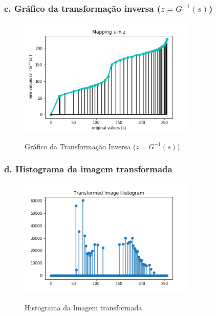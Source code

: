 \documentclass{article}
\begin{document}
\subsubsection*{c. Gráfico da transformação inversa ($z = G^{-1}(s)$)}

\begin{figure}[H]
	\label{fig:t_graph}
	\begin{minipage}[b]{1.0\linewidth}
		\centering
		\centerline{\includegraphics[width=8.5cm]{Figures/transform_graph}}
		\centerline{Gráfico da Transformação Inversa ($z = G^{-1}(s)$).}\medskip
	\end{minipage}
\end{figure}

\subsubsection*{d. Histograma da imagem transformada}

\begin{figure}[H]
	\label{fig:t_hist}
	\begin{minipage}[b]{1.0\linewidth}
		\centering
		\centerline{\includegraphics[width=8.5cm]{Figures/transformed_hist}}
		\centerline{Histograma da Imagem transformada}\medskip
	\end{minipage}
\end{figure}
\end{document}

